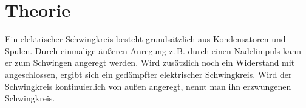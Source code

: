 \setcounter{page}{1}

\section{Theorie}

Ein elektrischer Schwingkreis besteht grundsätzlich
aus Kondensatoren und Spulen. %
Durch einmalige äußeren Anregung z.\,B. durch einen Nadelimpuls %
kann er zum Schwingen angeregt werden.  %
Wird zusätzlich noch ein Widerstand mit angeschlossen, ergibt sich ein
gedämpfter elektrischer Schwingkreis. %
Wird der Schwingkreis kontinuierlich von außen angeregt, nennt man
ihn erzwungenen Schwingkreis.
